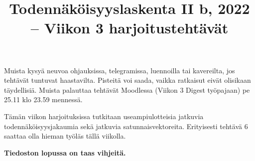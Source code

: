 \documentclass[11pt,a4paper]{amsart}
\title{Todennäköisyyslaskenta II b, 2022 -- Viikon 3 harjoitustehtävät}
\newcommand{\1}{\mathbf{1}}
\begin{document}
\maketitle

Muista kysyä neuvoa ohjauksissa, telegramissa, luennoilla tai kavereilta, jos tehtävät tuntuvat haastavilta. Pisteitä voi saada, vaikka ratkaisut eivät olisikaan täydellisiä.  Muista palauttaa tehtävät Moodlessa (Viikon 3 Digest työpajaan) pe 25.11 klo 23.59 mennessä.

\medskip 

Tämän viikon harjoituksissa tutkitaan useampiulotteisia jatkuvia todennäköisyysjakaumia sekä jatkuvia satunnaisvektoreita. Erityisesti tehtävä 6 saattaa olla hieman työläs tällä viikolla.

 {\bf Tiedoston lopussa on taas vihjeitä.}
\medskip 
\end{document}

